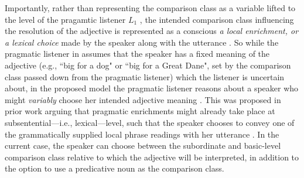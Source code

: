 Importantly, rather than representing the comparison class as a variable lifted to the level of the pragamtic listener $L_1$ \parencite[as proposed by][]{tessler2017warm}, the intended comparison class influencing the resolution of the adjective is represented as a conscious \emph{a local enrichment, or a lexical choice} made by the speaker along with the utterance \parencite[e.g., discussed for other phenomena by][]{chierchia2012grammatical, problang}. So while the pragmatic listener in \textcite{tessler2017warm} assumes that the speaker has a fixed meaning of the adjective (e.g., ``big for a dog" or ``big for a Great Dane", set by the comparison class passed down from the pragmatic listener) which the listener is uncertain about, in the proposed model the pragmatic listener reasons about a speaker who might \emph{variably} choose her intended adjective meaning \parencite[cf.][]{problang}. 
This was proposed in prior work arguing that pragmatic enrichments might already take place at subsentential---i.e., lexical---level, such that the speaker chooses to convey one of the grammatically supplied local phrase readings with her utterance \parencite[for instance, applied to scalar implicatures by][]{chierchia2012grammatical}. In the current case, the speaker can choose between the subordinate and basic-level comparison class relative to which the adjective will be interpreted, in addition to the option to use a predicative noun as the comparison class. 


